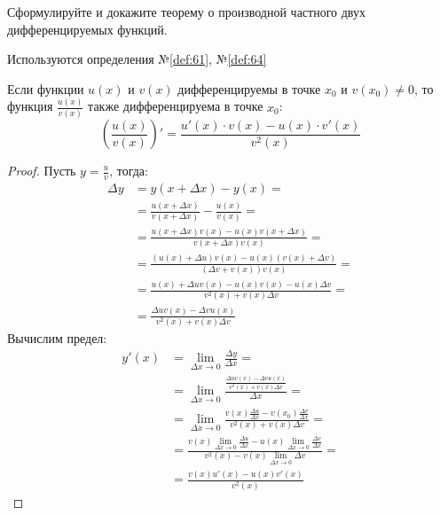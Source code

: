 \begin{question}
    Сформулируйте и докажите теорему о производной частного двух дифференцируемых функций.
\end{question}
\begin{used}
    Используются определения №\ref{def:61}, №\ref{def:64}
\end{used}
\begin{theorem}
    Если функции $u(x)$ и $v(x)$ дифференцируемы в точке $x_0$ и $v(x_0) \neq 0$, то функция $\frac{u(x)}{v(x)}$ также дифференцируема в точке $x_0$: \[
        \left(\frac{u(x)}{v(x)}\right)' = \frac{u'(x) \cdot v(x) - u(x) \cdot v'(x)}{v^2(x)}
    \]
\end{theorem}
\begin{proof}
    Пусть $y = \frac{u}{v}$, тогда:
    \begin{align*}
        \Delta y &= y(x + \Delta x) - y(x) = \\
                 &= \frac{u(x + \Delta x)}{v(x + \Delta x)} - \frac{u(x)}{v(x)} = \\
                 &= \frac{u(x + \Delta x)v(x) - u(x)v(x + \Delta x)}{v(x + \Delta x)v(x)} = \\
                 &= \frac{(u(x) + \Delta u)v(x) - u(x)(v(x) + \Delta v)}{(\Delta v + v(x))v(x)} = \\
                 &= \frac{u(x) + \Delta u v(x) - u(x)v(x) - u(x)\Delta v}{v^2(x) + v(x) \Delta v} = \\
                 &= \frac{\Delta u v(x) - \Delta v u(x)}{v^2(x) + v(x) \Delta v}
    \end{align*}
    Вычислим предел:
    \begin{align*}
        y'(x) &= \lim_{\Delta x \to 0} \frac{\Delta y}{\Delta x} = \\
              &= \lim_{\Delta x \to 0} \frac{\frac{\Delta u v(x) - \Delta v u(x)}{v^2(x) + v(x) \Delta v}}{\Delta x} = \\
              &= \lim_{\Delta x \to 0} \frac{v(x) \frac{\Delta u}{\Delta x} - v(x_0) \frac{\Delta v}{\Delta x}}{v^2(x) + v(x) \Delta v} = \\
              &= \frac{v(x) \lim_{\Delta x \to 0} \frac{\Delta u}{\Delta x} - u(x) \lim_{\Delta x \to 0}  \frac{\Delta v}{\Delta x}}{v^2(x) - v(x) \lim_{\Delta x \to 0} \Delta v} = \\
              &= \boxed{\frac{v(x) u'(x) - u(x) v'(x)}{v^2(x)}}
    \end{align*}
\end{proof}
\pagebreak



